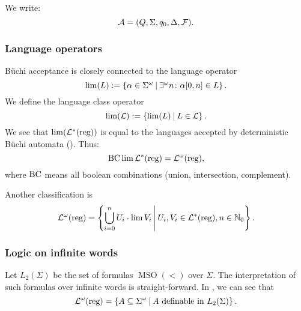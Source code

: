 We write:
\[ \mathcal{A} = (Q, \Sigma, q_0, \Delta, \mathcal{F}) . \]

\subsubsection{Language operators}

Büchi acceptance is closely connected to the language operator
\[ \lim(L) := \Set{ \alpha \in \Sigma^\omega }{ \existsinf n \colon \alpha[0,n] \in L } . \]
We define the language class operator
\[ \lim(\Lang) := \Set{\lim(L)}{L \in \Lang} . \]
We see that $\lim(\mathcal{L}^*(\text{reg}))$ is equal to the languages accepted by deterministic Büchi automata (\cite{InfCompR101}). %
Thus:
\[  \operatorname{BC} \lim \mathcal{L}^*(\text{reg}) = \mathcal{L}^\omega(\text{reg}) , \]
where $\operatorname{BC}$ means all boolean combinations (union, intersection, complement).

Another classification is
\[ \LangOreg = \Set{ \bigcup_{i=0}^n U_i \cdot \lim V_i }{ U_i, V_i \in \Langreg, n \in \N_0 } . \]

\subsubsection{Logic on infinite words}
Let $L_2(\Sigma)$ be the set of formulas $\operatorname{MSO}(<)$ over $\Sigma$. The interpretation of such formulas over infinite words is straight-forward. In \cite{CombR107}, we can see that
\[ \LangOreg = \Set{A \subseteq \Sigma^\omega}{A \text{ definable in } L_2(\Sigma)} . \]

